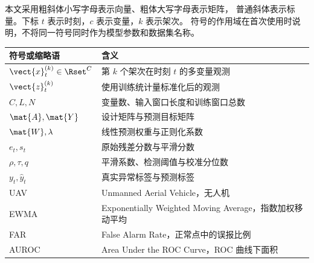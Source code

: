 本文采用粗斜体小写字母表示向量、粗体大写字母表示矩阵，
普通斜体表示标量。下标 $t$ 表示时刻，$c$ 表示变量，$k$ 表示架次。
符号的作用域在首次使用时说明，不将同一符号同时作为模型参数和数据集名称。

\begin{center}
\begin{tabularx}{\textwidth}{@{}lX@{}}
\toprule
符号或缩略语 & 含义 \\
\midrule
$\vect{x}^{(k)}_t\in\Rset^C$ & 第 $k$ 个架次在时刻 $t$ 的多变量观测 \\
$\vect{z}^{(k)}_t$ & 使用训练统计量标准化后的观测 \\
$C,L,N$ & 变量数、输入窗口长度和训练窗口总数 \\
$\mat{A},\mat{Y}$ & 设计矩阵与预测目标矩阵 \\
$\mat{W},\lambda$ & 线性预测权重与正则化系数 \\
$e_t,s_t$ & 原始残差分数与平滑分数 \\
$\rho,\tau,q$ & 平滑系数、检测阈值与校准分位数 \\
$y_t,\widehat y_t$ & 真实异常标签与预测标签 \\
UAV & Unmanned Aerial Vehicle，无人机 \\
EWMA & Exponentially Weighted Moving Average，指数加权移动平均 \\
FAR & False Alarm Rate，正常点中的误报比例 \\
AUROC & Area Under the ROC Curve，ROC 曲线下面积 \\
\bottomrule
\end{tabularx}
\end{center}
